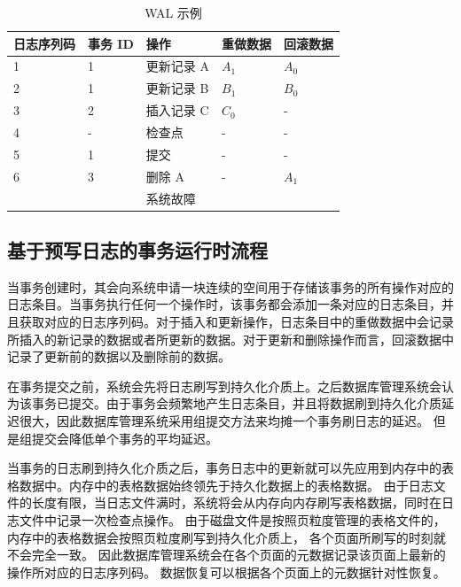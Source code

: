 \begin{table}
    \centering
    \caption{WAL 示例}
    \begin{tabular}{lllll}
        \toprule
        日志序列码 & 事务 ID & 操作       & 重做数据 & 回滚数据 \\
        \midrule
        1          & 1       & 更新记录 A & $A_1$    & $A_0$    \\
        2          & 1       & 更新记录 B & $B_1$    & $B_0$    \\
        3          & 2       & 插入记录 C & $C_0$    & -        \\
        4          & -       & 检查点     & -        & -        \\
        5          & 1       & 提交       & -        & -        \\
        6          & 3       & 删除 A     & -        & $A_1$    \\
                   &         & 系统故障   &          &          \\
        \bottomrule
    \end{tabular}
    \label{tab:wal}
\end{table}

\subsection{基于预写日志的事务运行时流程}

当事务创建时，其会向系统申请一块连续的空间用于存储该事务的所有操作对应的日志条目。当事务执行任何一个操作时，该事务都会添加一条对应的日志条目，并且获取对应的日志序列码。对于插入和更新操作，日志条目中的重做数据中会记录所插入的新记录的数据或者所更新的数据。对于更新和删除操作而言，回滚数据中记录了更新前的数据以及删除前的数据。

在事务提交之前，系统会先将日志刷写到持久化介质上。之后数据库管理系统会认为该事务已提交。由于事务会频繁地产生日志条目，并且将数据刷到持久化介质延迟很大，因此数据库管理系统采用组提交方法来均摊一个事务刷日志的延迟。
但是组提交会降低单个事务的平均延迟。

当事务的日志刷到持久化介质之后，事务日志中的更新就可以先应用到内存中的表格数据中。内存中的表格数据始终领先于持久化数据上的表格数据。
由于日志文件的长度有限，当日志文件满时，系统将会从内存向内存刷写表格数据，同时在日志文件中记录一次检查点操作。
由于磁盘文件是按照页粒度管理的表格文件的，内存中的表格数据会按照页粒度刷写到持久化介质上，
各个页面所刷写的时刻就不会完全一致。
因此数据库管理系统会在各个页面的元数据记录该页面上最新的操作所对应的日志序列码。
数据恢复可以根据各个页面上的元数据针对性恢复。


